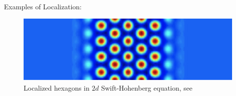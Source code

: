 \documentclass{beamer}
\begin{document}
\begin{frame}{Examples of Localization:}
\begin{figure}[ht]
  \centering
  \includegraphics[scale=0.8]
  {Figs/2d_sh_localized_hexagons.png}  
  \caption{Localized hexagons in $2d$ Swift-Hohenberg equation, see \cite{lloyd2008localized}}
  \label{fig:2d_sh_localized_hexagons}
\end{figure}
\end{frame}
\end{document}
